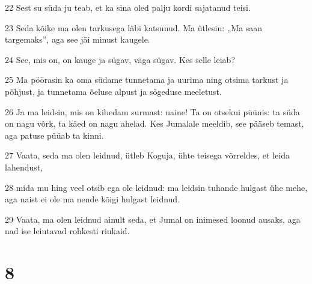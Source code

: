 \par 22 Sest su süda ju teab, et ka sina oled palju kordi sajatanud teisi.
\par 23 Seda kõike ma olen tarkusega läbi katsunud. Ma ütlesin: „Ma saan targemaks”, aga see jäi minust kaugele.
\par 24 See, mis on, on kauge ja sügav, väga sügav. Kes selle leiab?
\par 25 Ma pöörasin ka oma südame tunnetama ja uurima ning otsima tarkust ja põhjust, ja tunnetama õeluse alpust ja sõgeduse meeletust.
\par 26 Ja ma leidsin, mis on kibedam surmast: naine! Ta on otsekui püünis: ta süda on nagu võrk, ta käed on nagu ahelad. Kes Jumalale meeldib, see pääseb temast, aga patuse püüab ta kinni.
\par 27 Vaata, seda ma olen leidnud, ütleb Koguja, ühte teisega võrreldes, et leida lahendust,
\par 28 mida mu hing veel otsib ega ole leidnud: ma leidsin tuhande hulgast ühe mehe, aga naist ei ole ma nende kõigi hulgast leidnud.
\par 29 Vaata, ma olen leidnud ainult seda, et Jumal on inimesed loonud ausaks, aga nad ise leiutavad rohkesti riukaid.

\chapter{8}

